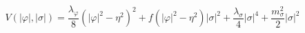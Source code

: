 \begin{equation}
V(|\varphi|,|\sigma|)= \frac{\lambda _{\varphi}}{8} (|\varphi|^2- \eta ^2)^2 + f(|\varphi|^2 - \eta ^2) |\sigma|^2 + \frac{\lambda _{\sigma}}{4}
|\sigma|^4 + \frac{m_{\sigma}^2}{2} |\sigma|^2
\end{equation}

